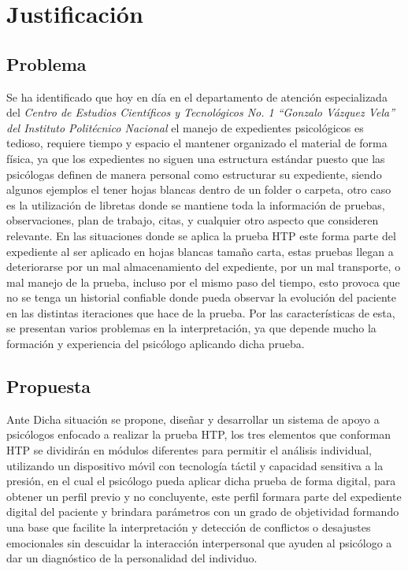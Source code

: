 \section{Justificación}

\subsection{Problema}
Se ha identificado que hoy en día en el departamento de atención especializada del \textit{Centro de Estudios Científicos y Tecnológicos No. 1 ``Gonzalo Vázquez Vela'' del Instituto Politécnico Nacional} el manejo de expedientes psicológicos es tedioso, requiere tiempo y espacio el mantener organizado el material de forma física, ya que los expedientes no siguen una estructura estándar puesto que las psicólogas definen de manera personal como estructurar su expediente, siendo algunos ejemplos el tener hojas blancas dentro de un folder o carpeta, otro caso es la utilización de libretas donde se mantiene toda la información de pruebas, observaciones, plan de trabajo, citas, y cualquier otro aspecto que consideren relevante. En las situaciones donde se aplica la prueba HTP este forma parte del expediente al ser aplicado en hojas blancas tamaño carta, estas pruebas llegan a deteriorarse por un mal almacenamiento del expediente, por un mal transporte, o mal manejo de la prueba, incluso por el mismo paso del tiempo, esto provoca que no se tenga un historial confiable donde pueda observar la evolución del paciente en las distintas iteraciones que hace de la prueba. Por las características de esta, se presentan varios problemas en la interpretación, ya que depende mucho la formación y experiencia del psicólogo aplicando dicha prueba.
\newline
\subsection{Propuesta}
Ante Dicha situación se propone, diseñar y desarrollar un sistema de apoyo a psicólogos enfocado a realizar la prueba HTP, los tres elementos que conforman HTP se dividirán en módulos diferentes para permitir el análisis individual, utilizando un dispositivo móvil con tecnología táctil y capacidad sensitiva a la presión, en el cual el psicólogo pueda aplicar dicha prueba de forma digital, para obtener un perfil previo y no concluyente, este perfil formara parte del expediente digital del paciente y brindara parámetros con un grado de objetividad formando una base que facilite la interpretación y detección de conflictos o desajustes emocionales sin descuidar la interacción interpersonal que ayuden al psicólogo a dar un diagnóstico de la personalidad del individuo.

